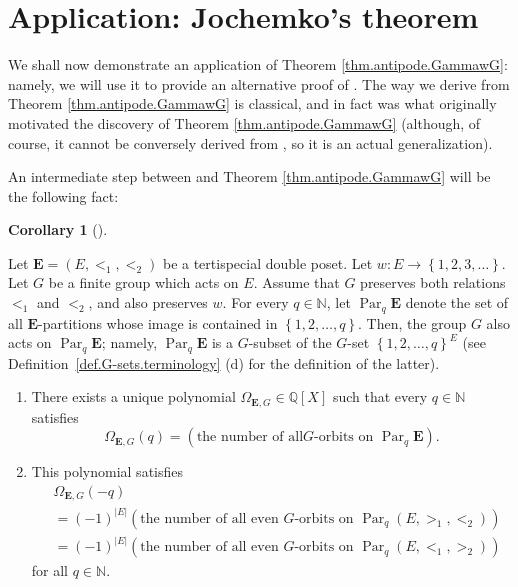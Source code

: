 \documentclass[numbers=enddot,12pt,final,onecolumn,notitlepage,abstracton]{scrartcl}
\theoremstyle{definition}
\newtheorem{coro}[theo]{Corollary}
\newenvironment{corollary}[1][]
{\begin{coro}[#1]\begin{leftbar}}
{\end{leftbar}\end{coro}}
\newcommand{\Par}{\operatorname{Par}}
\newcommand{\EE}{{\mathbf{E}}}
\newcommand{\NN}{{\mathbb{N}}}
\newcommand{\QQ}{{\mathbb{Q}}}
\begin{document}
\section{Application: Jochemko's theorem}
\label{sect.jochemko}

We shall now demonstrate an application of Theorem \ref{thm.antipode.GammawG}:
namely, we will use it to provide an alternative proof of \cite[Theorem
2.13]{Joch}. The way we derive \cite[Theorem 2.13]{Joch} from Theorem
\ref{thm.antipode.GammawG} is classical, and in fact was what originally
motivated the discovery of Theorem \ref{thm.antipode.GammawG} (although, of
course, it cannot be conversely derived from \cite[Theorem 2.13]{Joch}, so it
is an actual generalization).

An intermediate step between \cite[Theorem 2.13]{Joch} and Theorem
\ref{thm.antipode.GammawG} will be the following fact:

\begin{corollary}
\label{cor.reciprocity.GammawG}Let $ \EE =\left(  E,<_{1},<_{2}\right)
$ be a tertispecial double poset. Let $w:E\rightarrow\left\{  1,2,3,\ldots
\right\}  $. Let $G$ be a finite group which acts on $E$. Assume that $G$
preserves both relations $<_{1}$ and $<_{2}$, and also preserves $w$. For
every $q\in \NN $, let $\Par_q \EE$
denote the set of all $\EE$-partitions whose image is contained in
$\left\{  1,2,\ldots,q\right\}  $. Then, the group $G$ also acts on
$\Par_q \EE$; namely,
$\Par_q \EE$ is a $G$-subset of the $G$-set $\left\{  1,2,\ldots
,q\right\}  ^{E}$ (see Definition~\ref{def.G-sets.terminology} (d) for the
definition of the latter).

\begin{enumerate}
\item[(a)] There exists a unique polynomial $\Omega_{\EE, G}
\in \QQ \left[  X\right]  $ such that every $q\in \NN $ satisfies%
\begin{equation}
\Omega_{\EE, G}\left(  q\right)  =\left(  \text{the number of all
}G\text{-orbits on } \Par_q \EE \right)  .
\label{eq.cor.reciprocity.GammawG.a.def}
\end{equation}


\item[(b)] This polynomial satisfies%
\begin{align}
&  \Omega_{\EE,G}\left(  -q\right) \nonumber\\
&  =\left(  -1\right)  ^{\left\vert E\right\vert }\left(  \text{the number of
all even }G\text{-orbits on } \Par_q \left(
E,>_{1},<_{2}\right)  \right) \nonumber\\
&  =\left(  -1\right)  ^{\left\vert E\right\vert }\left(  \text{the number of
all even }G\text{-orbits on } \Par_q \left(
E,<_{1},>_{2}\right)  \right)
\label{eq.cor.reciprocity.GammawG.b.2}
\end{align}
for all $q\in \NN $.
\end{enumerate}
\end{corollary}
\end{document}
